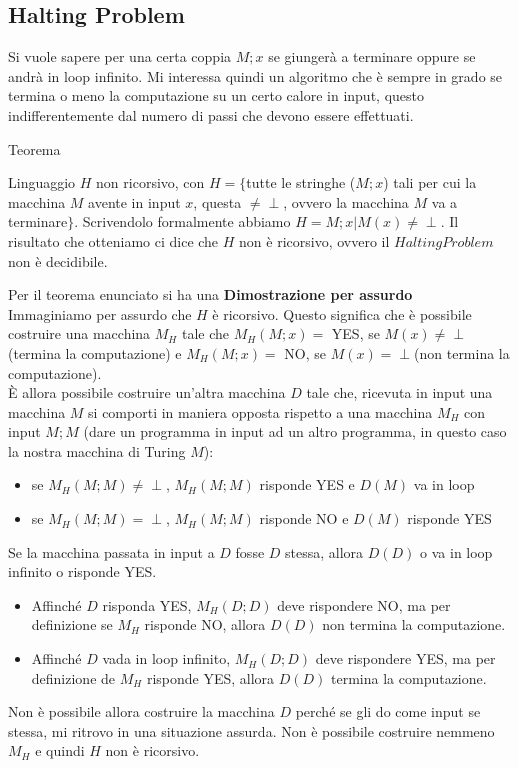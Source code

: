 \subsection{Halting Problem}
Si vuole sapere per una certa coppia $M;x$ se giungerà a terminare oppure se andrà in loop infinito. Mi interessa quindi un algoritmo che è sempre in grado se termina o meno la computazione su un certo calore in input, questo indifferentemente dal numero di passi che devono essere effettuati. \\
\begin{teorema}{Teorema}{}
\par
Linguaggio $H$ non ricorsivo, con $H = \{$tutte le stringhe ($M;x$) tali per cui la macchina $M$ avente in input $x$, questa $\neq \perp$, ovvero la macchina $M$ va a terminare$\}$. Scrivendolo formalmente abbiamo $H = {M;x | M(x) \neq \perp}$. Il risultato che otteniamo ci dice che $H$ non è ricorsivo, ovvero il $Halting Problem$ non è decidibile.
\end{teorema}
Per il teorema enunciato si ha una \textbf{Dimostrazione per assurdo}\\
Immaginiamo per assurdo che $H$ è ricorsivo. Questo significa che è possibile costruire una macchina $M_H$ tale che $M_H(M;x) =$ YES, se $M(x) \neq \perp$(termina la computazione) e $M_H(M;x) =$ NO, se $M(x) = \perp$(non termina la computazione).\\
È allora possibile costruire un’altra macchina $D$ tale che, ricevuta in input una macchina $M$ si comporti in maniera opposta rispetto a una macchina $M_H$ con input $M;M$ (dare un programma in input ad un altro programma, in questo caso la nostra macchina di Turing $M$):
\begin{itemize}
    \item se $M_H(M;M) \neq \perp$, $M_H(M; M)$ risponde YES e $D(M)$ va in loop
    \item se $M_H(M;M) = \perp$, $M_H(M; M)$ risponde NO e $D(M)$ risponde YES 
\end{itemize}
Se la macchina passata in input a $D$ fosse $D$ stessa, allora $D(D)$ o va in loop infinito o risponde YES.
\begin{itemize}
    \item Affinché $D$ risponda YES, $M_H(D;D)$ deve rispondere NO, ma per definizione se $M_H$ risponde NO, allora $D(D)$ non termina la computazione.
    \item Affinché $D$ vada in loop infinito, $M_H(D; D)$ deve rispondere YES, ma per definizione de $M_H$ risponde YES, allora $D(D)$ termina la computazione. 
\end{itemize}
Non è possibile allora costruire la macchina $D$ perché se gli do come input se stessa, mi ritrovo in una situazione assurda. Non è possibile costruire nemmeno $M_H$ e quindi $H$ non è ricorsivo. 


